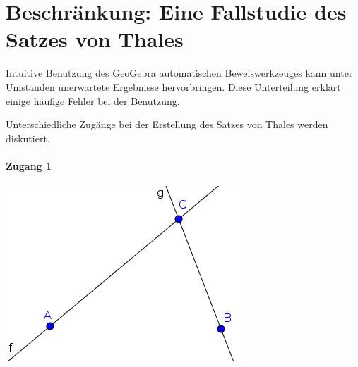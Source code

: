 \documentclass{article}
\begin{document}
\section{Beschränkung: Eine Fallstudie des Satzes von Thales}

Intuitive Benutzung des GeoGebra automatischen Beweiswerkzeuges kann unter Umständen unerwartete Ergebnisse hervorbringen. Diese Unterteilung erklärt einige häufige Fehler bei der Benutzung.

Unterschiedliche Zugänge bei der Erstellung des Satzes von Thales werden diskutiert.

\paragraph{Zugang 1}
\begin{center}
\includegraphics[scale=0.5]{limitations-Thales1-1}
\end{center}
\end{document}
